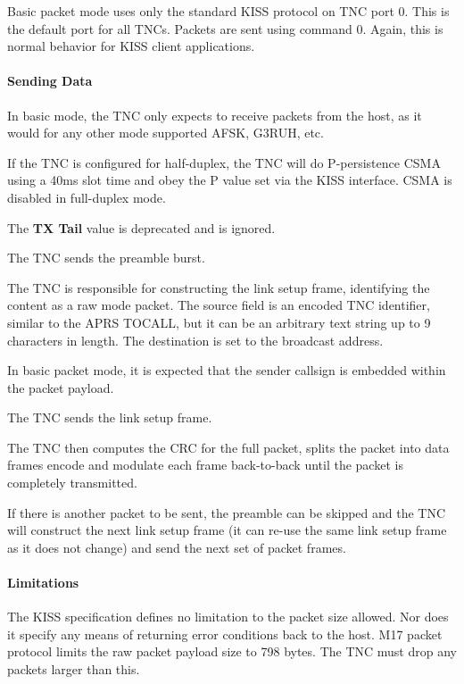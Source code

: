 \documentclass[a4paper,11pt]{book}
\begin{document}
Basic packet mode uses only the standard KISS protocol on TNC port 0. This is the default port for all TNCs. Packets are sent using command 0. Again, this is normal behavior for KISS client applications.

\paragraph{Sending Data}

In basic mode, the TNC only expects to receive packets from the host, as it would for any other mode supported AFSK, G3RUH, etc.

If the TNC is configured for half-duplex, the TNC will do P-persistence CSMA using a 40ms slot time and obey the P value set via the KISS interface. CSMA is disabled in full-duplex mode.

The \textbf{TX Tail} value is deprecated and is ignored.

The TNC sends the preamble burst.

The TNC is responsible for constructing the link setup frame, identifying the content as a raw mode packet. The source field is an encoded TNC identifier, similar to the APRS TOCALL, but it can be an arbitrary text string up to 9 characters in length. The destination is set to the broadcast address.

In basic packet mode, it is expected that the sender callsign is embedded within the packet payload.

The TNC sends the link setup frame.

The TNC then computes the CRC for the full packet, splits the packet into data frames encode and modulate each frame back-to-back until the packet is completely transmitted.

If there is another packet to be sent, the preamble can be skipped and the TNC will construct the next link setup frame (it can re-use the same link setup frame as it does not change) and send the next set of packet frames.

\paragraph{Limitations}

The KISS specification defines no limitation to the packet size allowed. Nor does it specify any means of returning error conditions back to the host. M17 packet protocol limits the raw packet payload size to 798 bytes. The TNC must drop any packets larger than this.
\end{document}
